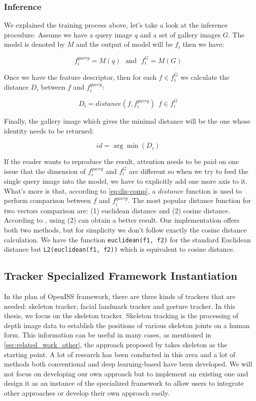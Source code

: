 \subsubsection{Inference}
\label{fw-recognizer-spec-inference}

We explained the training process above, let's take a look at the inference
procedure. Assume we have a query image $q$ and a set of gallery images $G$.
The model is denoted by $M$ and the output of model will be $f_i$ then we have:

$$
f_i^{query} = M(q) \:\:\: \text{and} \:\:\: f_i^{G} = M(G)
$$

Once we have the feature descriptor, then for each $f \in f_i^G$  we calculate
the distance $D_i$ between $f$ and $f_i^{query}$:

\begin{equation}
\label{eq:dis-comp}
D_i =  distance(f, f_i^{query}) \:\: f \in f_i^G
\end{equation}

Finally, the gallery image which gives the minimal distance will be the one
whose identity needs to be returned:

$$
id = \arg \min(D_i)
$$

If the reader wants to reproduce the result, attention needs to be paid on one issue
that the dimension of $f_i^{query}$ and $f_i^G$ are different so when we try
to feed the single query image into the model, we have to explicitly add one
more axis to it.
What's more is that, according to \autoref{eq:dis-comp},  a $distance$ function is
used to perform comparison between $f$ and $f_i^{query}$. The most popular
distance function for two vectors comparison are: (1) euclidean distance and (2)
cosine distance. According to \cite{tricks-and-baseline-for-reid-2019}, using
(2) can obtain a better result. Our implementation offers both two
methods, but for simplicity we don't follow exactly the cosine distance
calculation. We have the function \texttt{euclidean(f1, f2)} for the standard
Euclidean distance but \texttt{L2(euclidean(f1, f2))} which is equivalent to cosine distance.

\subsection{Tracker Specialized Framework Instantiation}
\label{sec:fw-inst-tracker}

In the plan of OpenISS framework, there are three kinds of trackers that are needed:
skeleton tracker, facial landmark tracker and gesture tracker. In this thesis,
we focus on the skeleton tracker.
Skeleton tracking is the processing of depth image data to establish the
positions of various skeleton joints on a human form. This information can be
useful in many cases, as mentioned in \autoref{sec:related_work_other},
the approach proposed by \cite{rgbd-for-reid} takes skeleton as the starting
point. A lot of research has been conducted in this area and a lot of
methods both conventional and deep learning-based have been developed. We will
not focus on developing our own approach but to implement an existing one and design it as an
instance of the specialized framework to allow users to integrate other approaches or
develop their own approach easily.

